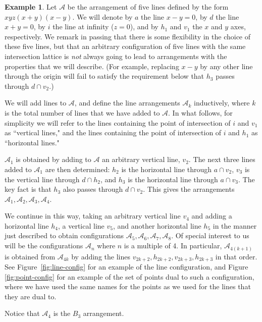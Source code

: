 \documentclass[12pt]{amsart}
\numberwithin{equation}{section}
\theoremstyle{definition}
\newtheorem{example}[theorem]{Example}
\begin{document}
\begin{example} \label{surprise}
 Let $\mathcal A$ be the arrangement of five lines defined by the form $xyz(x+y)(x-y)$. We will denote by $a$ the line $x-y = 0$, by $d$ the line $x+y =0$, by $i$ the line at infinity ($z =0$), and by $h_1$ and $v_1$ the $x$ and $y$ axes, respectively. We remark in passing that there is some flexibility in the choice of these five lines, but that an arbitrary  configuration of five lines with the same intersection lattice is {\em not} always going to lead to arrangements with the properties that we will describe. (For example, replacing $x-y$ by any other line through the origin will fail to satisfy the requirement below that $h_3$ passes through $d \cap v_2$.)

We will add lines to $\mathcal A$, and define the line arrangements $\mathcal A_k$ inductively, where $k$ is the total number of lines that we have added to $\mathcal A$. In what follows, for simplicity we will refer to the lines containing the point of intersection of $i$ and $v_1$ as ``vertical lines," and the lines containing the point of intersection of $i$ and $h_1$ as ``horizontal lines."

$\mathcal A_1$ is obtained by adding to $\mathcal A$  an arbitrary vertical line, $v_2$. The next three lines added to $\mathcal A_1$ are then determined: $h_2$ is the horizontal line through $a \cap v_2$, $v_3$ is the vertical line through $d \cap h_2$, and $h_3$ is the horizontal line through $a \cap v_3$. The key fact is that $h_3$ also passes through $d \cap v_2$. This gives the arrangements $\mathcal A_1, \mathcal A_2,\mathcal A_3, \mathcal A_4$.

We continue in this way, taking an arbitrary vertical line $v_4$ and adding a horizontal line $h_4$, a vertical line $v_5$, and another horizontal line $h_5$ in the manner just described to obtain configurations $\mathcal A_5, \mathcal A_6, \mathcal A_7, \mathcal A_8$. Of special interest to us will be the configurations $\mathcal A_n$ where $n$ is a multiple of 4. In particular, $\mathcal A_{4(k+1)}$ is obtained from $\mathcal A_{4k}$ by adding the lines $v_{2k+2}, h_{2k+2}, v_{2k+3}, h_{2k+3}$ in that order. See Figure~\ref{fig:line-config}
for an example of the line configuration, and Figure \ref{fig:point-config} for an example of the set of points dual to such a configuration, where we have used the same names for the points as we used for the lines that they are dual to.

Notice that $\mathcal A_4$ is the $B_3$ arrangement.


\end{example}
\end{document}
